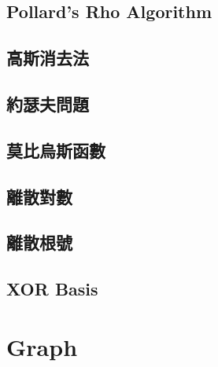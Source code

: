 \documentclass[a4paper,10pt,twocolumn,oneside]{article}
\newcommand{\inputcpp}[1]{}  %
\begin{document}
\subsection{Pollard's Rho Algorithm}
\inputcpp{math/pollard_rho.cpp}

\subsection{高斯消去法}
\inputcpp{math/gaussian_elimination.cpp}

\subsection{約瑟夫問題}
\inputcpp{math/josephus.cpp}

\subsection{莫比烏斯函數}
\inputcpp{math/MobiusFunction.cpp}

\subsection{離散對數}
\inputcpp{math/discrete_log.cpp}

\subsection{離散根號}
\inputcpp{math/discrete_sqrt.cpp}

\subsection{XOR Basis}
\inputcpp{math/xor_basis.cpp}


\section{Graph}
\end{document}
